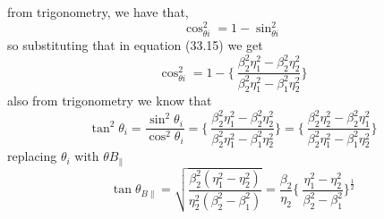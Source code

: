 from trigonometry, we have that,
\begin{equation*}
\cos^2_{\theta i} = 1 - \sin^2_{\theta i}
\end{equation*}
so substituting that in equation (33.15) we get 
\begin{equation}
\cos^2_{\theta i} = 1 - \Bigg\{\ \dfrac{\beta^2_2\eta^2_1 - \beta^2_2\eta^2_2}{\beta^2_2\eta^2_1 - \beta^2_1\eta^2_2} \Bigg\}
\end{equation}
also from trigonometry we know that
\begin{equation*}
\tan^2\theta_i = \dfrac{\sin^2\theta_i}{\cos^2\theta_i} = \Bigg\{\ \dfrac{\beta^2_2\eta^2_1 - \beta^2_2\eta^2_2}{\beta^2_2\eta^2_1 - \beta^2_1\eta^2_2} \Bigg\} = \Bigg\{\ \dfrac{\beta^2_2\eta^2_2 - \beta^2_2\eta^2_1}{\beta^2_2\eta^2_1 - \beta^2_1\eta^2_2} \Bigg\}
\end{equation*}
replacing $\theta_i$ with $\theta B_\parallel$
\begin{equation}
\tan\theta_{B\parallel} = \sqrt{\dfrac{\beta^2_2(\eta^2_1 - \eta^2_2)}{\eta^2_2(\beta^2_2 - \beta^2_1)}} = \dfrac{\beta_2}{\eta_2}\Bigg\{\ \dfrac{\eta^2_1 - \eta^2_2}{\beta^2_2 - \beta^2_1} \Bigg\}^{\frac{1}{2}}
\end{equation}

